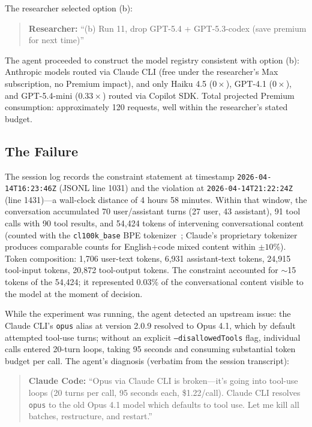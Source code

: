 \documentclass[11pt,a4paper]{article}
\begin{document}
The researcher selected option (b):

\begin{quote}
\textbf{Researcher:} ``(b) Run 11, drop GPT-5.4 + GPT-5.3-codex (save premium for next time)''
\end{quote}

The agent proceeded to construct the model registry consistent with option (b): Anthropic models routed via Claude CLI (free under the researcher's Max subscription, no Premium impact), and only Haiku 4.5 ($0\times$), GPT-4.1 ($0\times$), and GPT-5.4-mini ($0.33\times$) routed via Copilot SDK. Total projected Premium consumption: approximately 120 requests, well within the researcher's stated budget.

\subsection{The Failure}

The session log records the constraint statement at timestamp \texttt{2026-04-14T16:23:46Z} (JSONL line 1031) and the violation at \texttt{2026-04-14T21:22:24Z} (line 1431)---a wall-clock distance of 4 hours 58 minutes. Within that window, the conversation accumulated 70 user/assistant turns (27 user, 43 assistant), 91 tool calls with 90 tool results, and 54{,}424 tokens of intervening conversational content (counted with the \texttt{cl100k\_base} BPE tokenizer~\citep{openai2024tiktoken}; Claude's proprietary tokenizer produces comparable counts for English+code mixed content within $\pm 10\%$). Token composition: 1{,}706 user-text tokens, 6{,}931 assistant-text tokens, 24{,}915 tool-input tokens, 20{,}872 tool-output tokens. The constraint accounted for $\sim$15 tokens of the 54{,}424; it represented $0.03\%$ of the conversational content visible to the model at the moment of decision.

While the experiment was running, the agent detected an upstream issue: the Claude CLI's \texttt{opus} alias at version 2.0.9 resolved to Opus 4.1, which by default attempted tool-use turns; without an explicit \texttt{--disallowedTools} flag, individual calls entered 20-turn loops, taking 95 seconds and consuming substantial token budget per call. The agent's diagnosis (verbatim from the session transcript):

\begin{quote}
\textbf{Claude Code:} ``Opus via Claude CLI is broken---it's going into tool-use loops (20 turns per call, 95 seconds each, \$1.22/call). Claude CLI resolves \texttt{opus} to the old Opus 4.1 model which defaults to tool use. Let me kill all batches, restructure, and restart.''
\end{quote}
\end{document}
